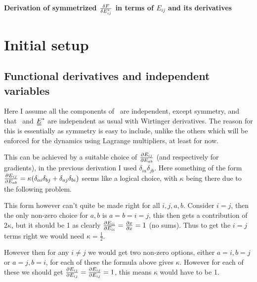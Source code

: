 \documentclass[11pt]{article}
\begin{document}
\begin{center}
    \LARGE
    \textbf{Derivation of symmetrized $\fdv{F}{E_{ij}^*}$ in terms of $E_{ij}$ and its derivatives}
\end{center}
\vspace{1em}
\section{Initial setup}
\subsection{Functional derivatives and independent variables}\label{sec:funcder}
Here I assume all the components of \EE\ are independent, except symmetry, and that \EE\ and $\du{E}^*$ are independent as usual with Wirtinger derivatives.
The reason for this is essentially as symmetry is easy to include, unlike the others which will be enforced for the dynamics using Lagrange multipliers, at least for now.

This can be achieved by a suitable choice of $\pdv{E_{ij}}{E_{ab}}$ (and respectively for gradients), in the previous derivation I used $\delta_{ia}\delta_{jb}$.
Here something of the form $\pdv{E_{ij}}{E_{ab}} = \kappa(\delta_{ai}\delta_{bj} + \delta_{aj}\delta_{bi})$ seems like a logical choice, with $\kappa$ being there due to the following problem.

This form however can't quite be made right for all $i,j,a,b$.
Consider $i=j$, then the only non-zero choice for $a,b$ is $a=b=i=j$, this then gets a contribution of $2\kappa$, but it should be 1 as clearly $\pdv{E_{ii}}{E_{ii}} = \pdv{x}{x}=1$ (no sums).
Thus to get the $i=j$ terms right we would need $\kappa=\frac{1}{2}$.

However then for any $i\neq j$ we would get two non-zero options, either $a=i,b=j$ or $a=j,b=i$, for each of these the formula above gives $\kappa$.
However for each of these we should get $\pdv{E_{ij}}{E_{ij}} = \pdv{E_{ij}}{E_{ij}} = 1$, this means $\kappa$ would have to be 1.
\end{document}
